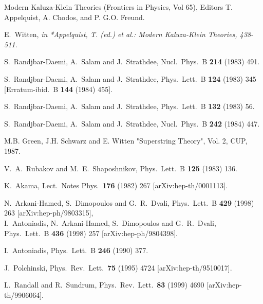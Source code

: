 \documentclass[a4paper,12pt]{article}
\begin{document}
\begin{thebibliography}{99}

 Modern Kaluza-Klein Theories (Frontiers in Physics, Vol
65), Editors T. Appelquist, A. Chodos, and P. G.O. Freund.

E.~Witten,
{\it  in *Appelquist, T. (ed.) et al.: Modern Kaluza-Klein Theories,
438-511.}

S.~Randjbar-Daemi, A.~Salam and J.~Strathdee,
Nucl.\ Phys.\ B {\bf 214} (1983) 491.

S.~Randjbar-Daemi, A.~Salam and J.~Strathdee,
Phys.\ Lett.\ B {\bf 124} (1983) 345
[Erratum-ibid.\ B {\bf 144} (1984) 455].

S.~Randjbar-Daemi, A.~Salam and J.~Strathdee,
Phys.\ Lett.\ B {\bf 132} (1983) 56.

S.~Randjbar-Daemi, A.~Salam and J.~Strathdee,
Nucl.\ Phys.\ B {\bf 242} (1984) 447.

M.B. Green, J.H. Schwarz and E. Witten
"Superstring Theory", Vol. 2, CUP, 1987.

V.~A.~Rubakov and M.~E.~Shaposhnikov,
Phys.\ Lett.\ B {\bf 125} (1983) 136.

K.~Akama,
Lect.\ Notes Phys.\  {\bf 176} (1982) 267
[arXiv:hep-th/0001113].

N.~Arkani-Hamed, S.~Dimopoulos and G.~R.~Dvali,
Phys.\ Lett.\ B {\bf 429} (1998) 263
[arXiv:hep-ph/9803315],\\
I.~Antoniadis, N.~Arkani-Hamed, S.~Dimopoulos and G.~R.~Dvali,
Phys.\ Lett.\ B {\bf 436} (1998) 257
[arXiv:hep-ph/9804398].

I.~Antoniadis,
Phys.\ Lett.\ B {\bf 246} (1990) 377.

J.~Polchinski,
Phys.\ Rev.\ Lett.\  {\bf 75} (1995) 4724
[arXiv:hep-th/9510017].

L.~Randall and R.~Sundrum,
Phys.\ Rev.\ Lett.\  {\bf 83} (1999) 4690
[arXiv:hep-th/9906064].


\end{thebibliography}
\end{document}
